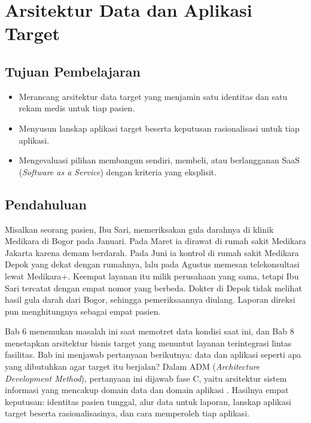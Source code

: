\chapter{Arsitektur Data dan Aplikasi Target}

\section*{Tujuan Pembelajaran}
\begin{itemize}
  \item Merancang arsitektur data target yang menjamin satu identitas dan satu rekam medis untuk tiap pasien.
  \item Menyusun lanskap aplikasi target beserta keputusan rasionalisasi untuk tiap aplikasi.
  \item Mengevaluasi pilihan membangun sendiri, membeli, atau berlangganan SaaS (\textit{Software as a Service}) dengan kriteria yang eksplisit.
\end{itemize}

\section{Pendahuluan}

Misalkan seorang pasien, Ibu Sari, memeriksakan gula darahnya di klinik
Medikara di Bogor pada Januari. Pada Maret ia dirawat di rumah sakit Medikara
Jakarta karena demam berdarah. Pada Juni ia kontrol di rumah sakit Medikara
Depok yang dekat dengan rumahnya, lalu pada Agustus memesan telekonsultasi
lewat Medikara+. Keempat layanan itu milik perusahaan yang sama, tetapi Ibu
Sari tercatat dengan empat nomor yang berbeda. Dokter di Depok tidak melihat
hasil gula darah dari Bogor, sehingga pemeriksaannya diulang. Laporan direksi
pun menghitungnya sebagai empat pasien.

Bab 6 menemukan masalah ini saat memotret data kondisi saat ini, dan Bab 8
menetapkan arsitektur bisnis target yang menuntut layanan terintegrasi lintas
fasilitas. Bab ini menjawab pertanyaan berikutnya: data dan aplikasi seperti
apa yang dibutuhkan agar target itu berjalan? Dalam ADM (\textit{Architecture
Development Method}), pertanyaan ini dijawab fase C, yaitu arsitektur sistem
informasi yang mencakup domain data dan domain aplikasi \cite{togaf10}.
Hasilnya empat keputusan: identitas pasien tunggal, alur data untuk laporan,
lanskap aplikasi target beserta rasionalisasinya, dan cara memperoleh tiap
aplikasi.

